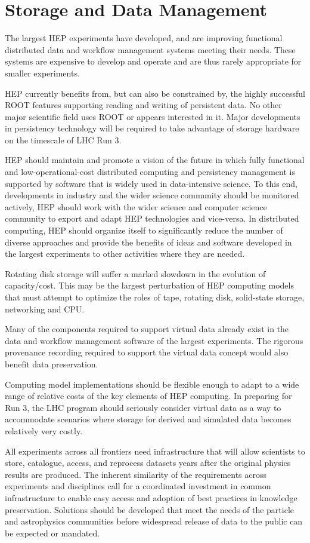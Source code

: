 \section{Storage and Data Management}

The largest HEP experiments have developed, and are  improving
functional distributed data and workflow management systems meeting
their needs. These systems are expensive to develop and operate and
are thus  rarely appropriate for smaller experiments.

HEP currently benefits from, but can also be  constrained by, the
highly successful ROOT features supporting reading  and writing of
persistent data. No other major scientific field uses  ROOT or appears
interested in it. Major developments in persistency  technology will
be required to take advantage of storage hardware on the  timescale of
LHC Run 3.

HEP should maintain and promote a vision of the future  in which fully
functional and low-operational-cost distributed computing and
persistency management is supported by software that is widely used in
data-intensive science.  To this end, developments in industry and the
wider  science community should be monitored actively, HEP should work
with the wider  science and computer science community to export and
adapt HEP technologies and  vice-versa. In distributed computing, HEP
should organize itself to significantly  reduce the number of diverse
approaches and provide the benefits of ideas and  software developed
in the largest experiments to other activities where they are needed.

Rotating disk storage will suffer a marked slowdown in the  evolution
of capacity/cost.  This may be the largest perturbation of HEP
computing  models that must attempt to optimize the roles of tape,
rotating disk, solid-state  storage, networking and CPU.

Many of the components required to support virtual data  already exist
in the data and workflow management software of the largest
experiments.   The rigorous provenance recording required to support
the virtual data concept would  also benefit data preservation.

Computing model implementations should be flexible  enough to adapt to
a wide range of relative costs of the key elements of HEP  computing.
In preparing for Run 3, the LHC program should seriously consider
virtual data as a way to accommodate scenarios where storage for
derived and  simulated data becomes relatively very costly.

All experiments across all frontiers
need  infrastructure that will allow scientists to store, catalogue,
access, and  reprocess datasets years after the original physics
results are produced.  The inherent similarity of the requirements
across experiments and disciplines  call for a coordinated investment
in common infrastructure to enable easy  access and adoption of best
practices in knowledge preservation.  Solutions  should be developed
that meet the needs of the particle and astrophysics  communities
before widespread release of data to the public can be expected  or
mandated.
